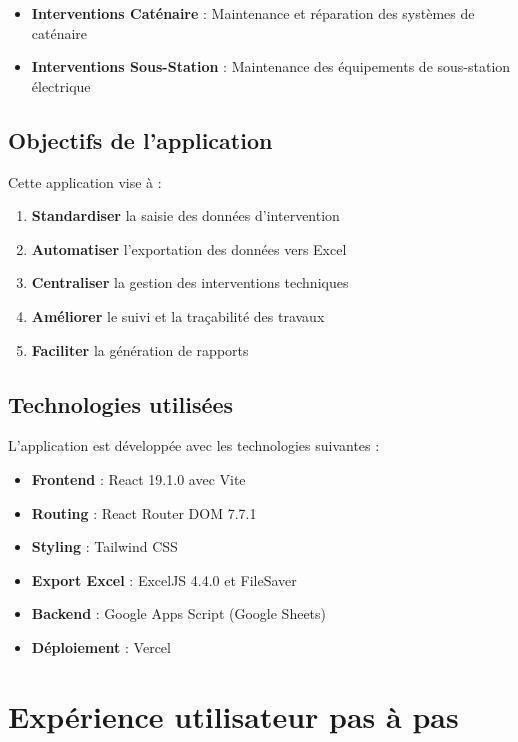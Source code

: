 \documentclass[12pt,a4paper]{report}
\begin{document}
\begin{itemize}
    \item \textbf{Interventions Caténaire} : Maintenance et réparation des systèmes de caténaire
    \item \textbf{Interventions Sous-Station} : Maintenance des équipements de sous-station électrique
\end{itemize}

\section{Objectifs de l'application}

Cette application vise à :

\begin{enumerate}
    \item \textbf{Standardiser} la saisie des données d'intervention
    \item \textbf{Automatiser} l'exportation des données vers Excel
    \item \textbf{Centraliser} la gestion des interventions techniques
    \item \textbf{Améliorer} le suivi et la traçabilité des travaux
    \item \textbf{Faciliter} la génération de rapports
\end{enumerate}

\section{Technologies utilisées}

L'application est développée avec les technologies suivantes :

\begin{itemize}
    \item \textbf{Frontend} : React 19.1.0 avec Vite
    \item \textbf{Routing} : React Router DOM 7.7.1
    \item \textbf{Styling} : Tailwind CSS
    \item \textbf{Export Excel} : ExcelJS 4.4.0 et FileSaver
    \item \textbf{Backend} : Google Apps Script (Google Sheets)
    \item \textbf{Déploiement} : Vercel
\end{itemize}


\chapter{Expérience utilisateur pas à pas}
\end{document}
